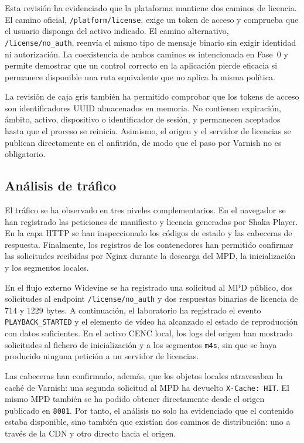 Esta revisión ha evidenciado que la plataforma mantiene dos caminos de licencia. El camino oficial, \nolinkurl{/platform/license}, exige un token de acceso y comprueba que el usuario disponga del activo indicado. El camino alternativo, \nolinkurl{/license/no_auth}, reenvía el mismo tipo de mensaje binario sin exigir identidad ni autorización. La coexistencia de ambos caminos es intencionada en Fase~0 y permite demostrar que un control correcto en la aplicación pierde eficacia si permanece disponible una ruta equivalente que no aplica la misma política.

La revisión de caja gris también ha permitido comprobar que los tokens de acceso son identificadores UUID almacenados en memoria. No contienen expiración, ámbito, activo, dispositivo o identificador de sesión, y permanecen aceptados hasta que el proceso se reinicia. Asimismo, el origen y el servidor de licencias se publican directamente en el anfitrión, de modo que el paso por Varnish no es obligatorio.

\subsection{Análisis de tráfico}

El tráfico se ha observado en tres niveles complementarios. En el navegador se han registrado las peticiones de manifiesto y licencia generadas por Shaka Player. En la capa HTTP se han inspeccionado los códigos de estado y las cabeceras de respuesta. Finalmente, los registros de los contenedores han permitido confirmar las solicitudes recibidas por Nginx durante la descarga del MPD, la inicialización y los segmentos locales.

En el flujo externo Widevine se ha registrado una solicitud al MPD público, dos solicitudes al endpoint \nolinkurl{/license/no_auth} y dos respuestas binarias de licencia de 714 y 1229 bytes. A continuación, el laboratorio ha registrado el evento \nolinkurl{PLAYBACK_STARTED} y el elemento de vídeo ha alcanzado el estado de reproducción con datos suficientes. En el activo CENC local, los logs del origen han mostrado solicitudes al fichero de inicialización y a los segmentos \nolinkurl{m4s}, sin que se haya producido ninguna petición a un servidor de licencias.

Las cabeceras han confirmado, además, que los objetos locales atravesaban la caché de Varnish: una segunda solicitud al MPD ha devuelto \nolinkurl{X-Cache: HIT}. El mismo MPD también se ha podido obtener directamente desde el origen publicado en \nolinkurl{8081}. Por tanto, el análisis no solo ha evidenciado que el contenido estaba disponible, sino también que existían dos caminos de distribución: uno a través de la CDN y otro directo hacia el origen.

